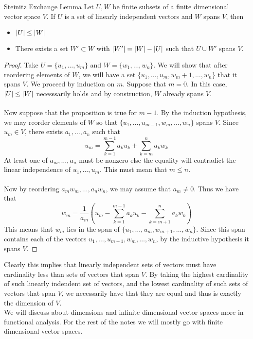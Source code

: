 \documentclass[a4paper]{article}
\begin{document}
\begin{thm}{Steinitz Exchange Lemma}{} Let $U,W$ be finite subsets of a finite dimensional vector space $V$. If $U$ is a set of linearly independent vectors and $W$ spans $V$, then 
\begin{itemize}
\item $\abs{U}\leq\abs{W}$
\item There exists a set $W'\subset W$ with $\abs{W'}=\abs{W}-\abs{U}$ such that $U\cup W'$ spans $V$. 
\end{itemize} \tcbline
\begin{proof}
Take $U=\{u_1,\dots,u_m\}$ and $W=\{w_1,\dots,w_n\}$. We will show that after reordering elements of $W$, we will have a set $\{u_1,\dots,u_m,w_m+1,\dots,w_n\}$ that it spans $V$. We proceed by induction on $m$. Suppose that $m=0$. In this case, $\abs{U}\leq\abs{W}$ necesssarily holds and by construction, $W$ already spans $V$. \\~\\
Now suppose that the proposition is true for $m-1$. By the induction hypothesis, we may reorder elements of $W$ so that $\{u_1,\dots,u_{m-1},w_m,\dots,w_n\}$ spans $V$. Since $u_m\in V$, there exists $a_1,\dots,a_n$ such that $$u_m=\sum_{k=1}^{m-1}a_ku_k+\sum_{k=m}^na_kw_k$$ At least one of $a_m,\dots,a_n$ must be nonzero else the equality will contradict the linear independence of $u_1,\dots,u_m$. This must mean that $m\leq n$. \\~\\
Now by reordering $a_mw_m,\dots,a_nw_n$, we may assume that $a_m\neq 0$. Thus we have that $$w_m=\frac{1}{a_m}\left(u_m-\sum_{k=1}^{m-1}a_ku_k-\sum_{k=m+1}^na_kw_k\right)$$ This means that $w_m$ lies in the span of $\{u_1,\dots,u_m,w_{m+1},\dots,w_n\}$. Since this span contains each of the vectors $u_1,\dots,u_{m-1},w_m,\dots,w_n$, by the inductive hypothesis it spans $V$. 
\end{proof}
\end{thm}

Clearly this implies that linearly independent sets of vectors must have cardinality less than sets of vectors that span $V$. By taking the highest cardinality of such linearly indendent set of vectors, and the lowest cardinality of such sets of vectors that span $V$, we necessarily have that they are equal and thus is exactly the dimension of $V$. \\

We will discuss about dimensions and infinite dimensional vector spaces more in functional analysis. For the rest of the notes we will mostly go with finite dimensional vector spaces. \\
\end{document}
